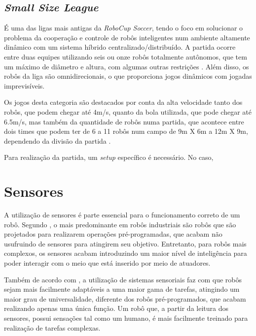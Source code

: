 \documentclass[acronym, symbols]{fei}
\begin{document}
	\subsection{\textit{Small Size League}}
	
		É uma das ligas mais antigas da \textit{RoboCup Soccer}, tendo o foco em solucionar o problema da cooperação e controle de robôs inteligentes num ambiente altamente dinâmico com um sistema híbrido centralizado/distribuído. A partida ocorre entre duas equipes utilizando seis ou onze robôs totalmente autônomos, que tem um máximo de diâmetro e altura, com algumas outras restrições \cite{RoboCup}. Além disso, os robôs da liga são omnidirecionais, o que proporciona jogos dinâmicos com jogadas imprevisíveis.
		
		Os jogos desta categoria são destacados por conta da alta velocidade tanto dos robôs, que podem chegar até 4m/s, quanto da bola utilizada, que pode chegar até 6.5m/s, mas também da quantidade de robôs numa partida, que acontece entre dois times que podem ter de 6 a 11 robôs num campo de 9m X 6m a 12m X 9m, dependendo da divisão da partida \cite{10332958}.
		
		Para realização da partida, um \textit{setup} específico é necessário. No caso,
		
		
	\section{Sensores}
	
		A utilização de sensores é parte essencial para o funcionamento correto de um robô. Segundo \textcite{de2017tipos}, o mais predominante em robôs industriais são robôs que são projetados para realizarem operações pré-programadas, que acabam não usufruindo de sensores para atingirem seu objetivo. Entretanto, para robôs mais complexos, os sensores acabam introduzindo um maior nível de inteligência para poder interagir com o meio que está inserido por meio de atuadores.
		
		Também de acordo com \textcite{de2017tipos}, a utilização de sistemas sensoriais faz com que robôs sejam mais facilmente adaptáveis a uma maior gama de tarefas, atingindo um maior grau de universalidade, diferente dos robôs pré-programados, que acabam realizando apenas uma única função. Um robô que, a partir da leitura dos sensores, possui sensações tal como um humano, é mais facilmente treinado para realização de tarefas complexas.
		
\end{document}
